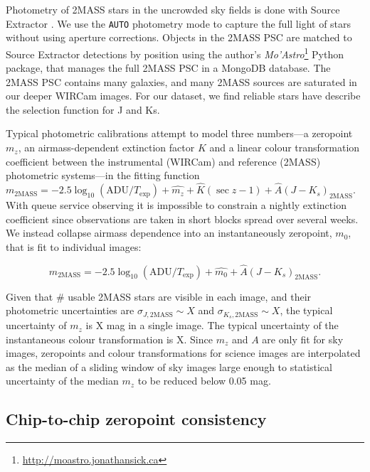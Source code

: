 \documentclass[iop]{emulateapj}
\newcommand{\sw}[1]{\textit{#1}} %
\newcommand{\todo}[1]{\textcolor{RedOrange}{#1}} %
\begin{document}
Photometry of 2MASS stars in the uncrowded sky fields is done with Source Extractor \citep{Bertin:1996}.
We use the \texttt{AUTO} photometry mode to capture the full light of stars without using aperture corrections.
Objects in the 2MASS PSC are matched to Source Extractor detections by position using the author's \sw{Mo'Astro}\footnote{\url{http://moastro.jonathansick.ca}} Python package, that manages the full 2MASS PSC in a MongoDB database.
The 2MASS PSC contains many galaxies, and many 2MASS sources are saturated in our deeper WIRCam images.
For our dataset, we find reliable stars have \todo{describe the selection function for J and Ks}.

Typical photometric calibrations attempt to model three numbers---a zeropoint $m_z$, an airmass-dependent extinction factor $K$ and a linear colour transformation coefficient between the instrumental (WIRCam) and reference (2MASS) photometric systems---in the fitting function $m_\mathrm{2MASS} = -2.5 \log_{10}(\mathrm{ADU}/T_\mathrm{exp}) + \hat{m_z} + \hat{K} (\sec z -1) + \hat{A} (J-K_s)_\mathrm{2MASS}$.
With queue service observing it is impossible to constrain a nightly extinction coefficient since observations are taken in short blocks spread over several weeks.
We instead collapse airmass dependence into an instantaneously zeropoint, $m_0$, that is fit to individual images:

\begin{equation}
  \label{eq:photcal}
  m_\mathrm{2MASS} = -2.5 \log_{10}(\mathrm{ADU}/T_\mathrm{exp}) + \hat{m_0} + \hat{A} (J-K_s)_\mathrm{2MASS}.
\end{equation}

Given that \todo{\#} usable 2MASS stars are visible in each image, and their photometric uncertainties are $\sigma_{J,\mathrm{2MASS}}\sim X$ and $\sigma_{K_s,\mathrm{2MASS}}\sim X$, the typical uncertainty of $m_z$ is \todo{X} mag in a single image. The typical uncertainty of the instantaneous colour transformation is \todo{X}. Since $m_z$ and $A$ are only fit for sky images, zeropoints and colour transformations for science images are interpolated as the median of a sliding window of sky images large enough to statistical uncertainty of the median $m_z$ to be reduced below 0.05 mag.

\subsection{Chip-to-chip zeropoint consistency}
\label{sec:chip_zp}
\end{document}
